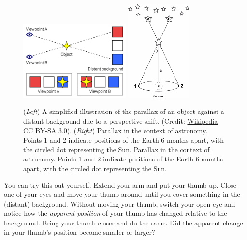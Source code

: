 \documentclass[11pt]{article}
\begin{document}
\begin{figure}[h!]
    \centering
    \includegraphics[width=0.5\textwidth]{Images/Parallax_Example.png}
    \includegraphics[width=0.3\textwidth]{Images/parallax.png}
    \caption{(\textsl{Left}) A simplified illustration of the parallax of an object against a distant background due to a perspective shift. (Credit: \href{https://en.wikipedia.org/wiki/Parallax\#/media/File:Parallax_Example.png}{Wikipedia} \href{https://creativecommons.org/licenses/by-sa/3.0/}{CC BY-SA 3.0}). (\textsl{Right}) Parallax in the context of astronomy. Points 1 and 2 indicate positions of the Earth 6 months apart, with the circled dot representing the Sun. Parallax in the context of astronomy. Points 1 and 2 indicate positions of the Earth 6 months apart, with the circled dot representing the Sun.}
    \label{fig:parallax_example}
\end{figure}

\noindent
You can try this out yourself. Extend your arm and put your thumb up. Close one of your eyes and move your thumb around until you cover something in the (distant) background. Without moving your thumb, switch your open eye and notice how the \textsl{apparent position} of your thumb has changed relative to the background. Bring your thumb closer and do the same. Did the apparent change in your thumb's position become smaller or larger? 
\end{document}
